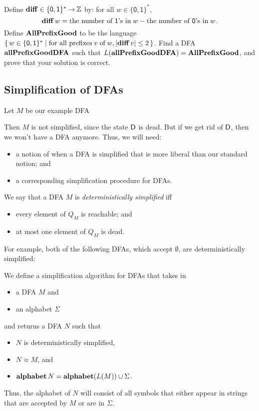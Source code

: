 \begin{exercise}
\label{AllGoodDFACorrLem}
Define $\mathbf{diff}\in\{\mathsf{0,1}\}^*\mathbin{\to}\mathbb{Z}$ by:
%
%
%
%
for all $w\in\{\mathsf{0,1}\}^*$,
\begin{displaymath}
\mathbf{diff}\,w =
\allowbreak\mbox{the number of $\mathsf{1}$'s in}\allowbreak\;w -
\allowbreak\mbox{the number of $\mathsf{0}$'s in}\allowbreak\;w .
\end{displaymath}
Define $\mathbf{AllPrefixGood}$ to be the language
$\{ \, w\in\{\mathsf{0,1}\}^* \mid \allowbreak\mbox{for all prefixes}\allowbreak\; v\;\allowbreak\mbox{of}\allowbreak\;
  w, |\mathbf{diff}\,v|\leq 2 \, \}$.  Find a DFA $\mathbf{allPrefixGoodDFA}$ such that
$L(\mathbf{allPrefixGoodDFA}) = \mathbf{AllPrefixGood}$, and prove that your solution
is correct.
\end{exercise}

\subsection{Simplification of DFAs}

Let $M$ be our example DFA
\begin{center}

\end{center}
Then $M$ is not simplified, since the state $\mathsf{D}$ is dead.  But if we
get rid of $\mathsf{D}$, then we won't have a DFA anymore.  Thus, we will
need:
\begin{itemize}
\item a notion of when a DFA is simplified that is more liberal than
  our standard notion; and

\item a corresponding simplification procedure for DFAs.
\end{itemize}
We say that a DFA $M$ is \emph{deterministically simplified} iff
\begin{itemize}
\item every element of $Q_M$ is reachable; and

\item at most one element of $Q_M$ is dead.
\end{itemize}
For example, both of the following DFAs, which accept $\emptyset$,
are deterministically simplified:
\begin{center}

\end{center}

We define a simplification algorithm for DFAs that takes in
\begin{itemize}
\item a DFA $M$ and
\item an alphabet $\Sigma$
\end{itemize}
and returns a DFA $N$ such that
\begin{itemize}
\item $N$ is deterministically simplified,

\item $N\approx M$, and

\item $\mathbf{alphabet}\,N = \mathbf{alphabet}(L(M))\cup\Sigma$.
\end{itemize}
Thus, the alphabet of $N$ will consist of all symbols that
either appear in strings that are accepted by $M$ or are in $\Sigma$.

